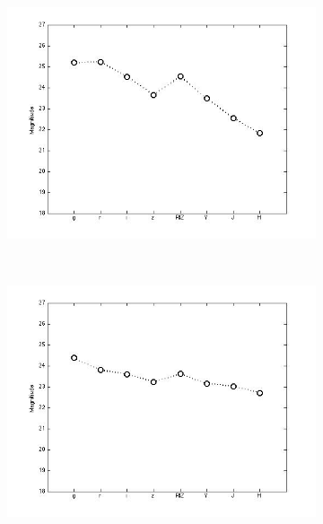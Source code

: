 \documentclass[useAMS,usenatbib,fleqn]{mn2e}
\begin{document}
\begin{figure}
\begin{subfigure}[b]{0.075\textwidth}
                \includegraphics[trim = 35px 15px 50px 25px, clip=true,width=\textwidth]{basis_03.jpg}
        \end{subfigure}
        ~
        \begin{subfigure}[b]{0.075\textwidth}
                \includegraphics[trim = 35px 15px 50px 25px, clip=true,width=\textwidth]{basis_04.jpg}
        \end{subfigure}
        ~
        \begin{subfigure}[b]{0.075\textwidth}

\end{subfigure}
\end{figure}
\end{document}
